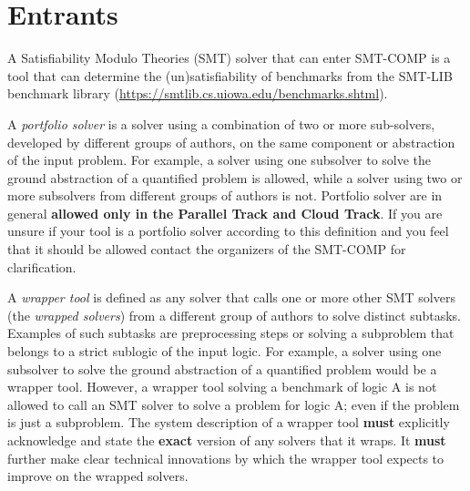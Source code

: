 \documentclass[12pt]{article}
\newcommand{\paralleltrack}{Parallel Track\xspace}
\newcommand{\cloudtrack}{Cloud Track\xspace}
\newcommand{\rationale}[1]{\hskip .5em{\textit{Rationale:} #1}\xspace}
\begin{document}


\section{Entrants}
\label{sec:entrants}

%
A Satisfiability Modulo Theories (SMT) solver that can enter SMT-COMP is a tool that can determine the
(un)satisfia\-bility of benchmarks from the SMT-LIB benchmark library
(\url{https://smtlib.cs.uiowa.edu/benchmarks.shtml}).

%
A \emph{portfolio solver} is a solver using a combination of two or
more sub-solvers, developed by different groups of authors, on the
same component or abstraction of the input problem.  For example, a
solver using one subsolver to solve the ground abstraction of a
quantified problem is allowed, while a solver using two or more
subsolvers from different groups of authors is not.
Portfolio solver are in general \textbf{allowed only in the
\paralleltrack{} and \cloudtrack{}}.
If you are unsure if your tool is a portfolio solver according to this
definition and you feel that it should be allowed contact the
organizers of the SMT-COMP for clarification.

%
A \emph{wrapper tool} is defined as any solver that calls one or more other SMT
solvers (the \emph{wrapped solvers}) from a different
group of authors to solve distinct subtasks.
Examples of such subtasks are preprocessing steps or solving a subproblem that belongs to a strict sublogic of the input logic.
For example, a solver using one subsolver to solve the ground abstraction of a
quantified problem would be a wrapper tool.
However, a wrapper tool solving a benchmark of logic A is not allowed to call an SMT solver
to solve a problem for logic A; even if the problem is just a subproblem.
The system description of a wrapper tool \textbf{must}
explicitly acknowledge and state the \textbf{exact} version of any solvers that
it wraps.  It \textbf{must} further make clear technical innovations by which
the wrapper tool expects to improve on the wrapped solvers.
\end{document}
